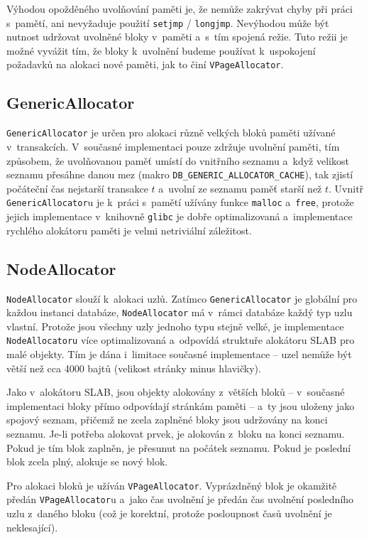 Výhodou opožděného uvolňování paměti je, že nemůže zakrývat chyby při
práci s~pamětí, ani nevyžaduje použití \verb|setjmp| / \verb|longjmp|. Nevýhodou
může být nutnost udržovat uvolněné bloky v~paměti a~s~tím spojená režie.
Tuto režii je možné vyvážit tím, že bloky k~uvolnění budeme používat
k~uspokojení požadavků na alokaci nové paměti, jak to činí \verb|VPageAllocator|.

\subsection{GenericAllocator}
\verb|GenericAllocator| je určen pro alokaci různě velkých bloků paměti užívané 
v~transakcích.
V~současné implementaci pouze zdržuje uvolnění paměti,
tím způsobem, že uvolňovanou paměť umístí do vnitřního seznamu a~když velikost
seznamu přesáhne danou mez (makro \verb|DB_GENERIC_ALLOCATOR_CACHE|),
tak zjistí počáteční čas nejstarší transakce $t$ a~uvolní ze seznamu paměť starší
než $t$. Uvnitř \verb|GenericAllocator|u je k~práci s~pamětí užívány funkce
\verb|malloc| a~\verb|free|, protože jejich implementace v~knihovně \verb|glibc|
je dobře optimalizovaná a~implementace rychlého alokátoru paměti je velmi
netriviální záležitost.

\subsection{NodeAllocator}
\verb|NodeAllocator| slouží k~alokaci uzlů. Zatímco \verb|GenericAllocator| je globální
pro každou instanci databáze, \verb|NodeAllocator| má v~rámci databáze každý typ
uzlu vlastní. Protože jsou všechny uzly jednoho typu stejně velké, je implementace
\verb|NodeAllocatoru| více optimalizovaná a~odpovídá struktuře alokátoru SLAB
\cite{BonwickSlabAllocator} pro malé objekty.
Tím je dána i~limitace současné implementace -- uzel nemůže být větší než cca 4000 bajtů
(velikost stránky minus hlavičky).

Jako v~alokátoru SLAB, jsou objekty alokovány z~větších bloků -- v~současné implementaci
bloky přímo odpovídají stránkám paměti -- a~ty jsou uloženy jako spojový seznam,
přičemž ne zcela zaplněné bloky jsou udržovány na konci seznamu. Je-li potřeba alokovat
prvek, je alokován z~bloku na konci seznamu. Pokud je tím blok zaplněn, je přesunut
na počátek seznamu. Pokud je poslední blok zcela plný, alokuje se nový blok.

Pro alokaci bloků je užíván \verb|VPageAllocator|. Vyprázdněný blok je okamžitě
předán \verb|VPageAllocator|u a~jako čas uvolnění je předán čas uvolnění posledního
uzlu z~daného bloku (což je korektní, protože posloupnost časů uvolnění je neklesající).

